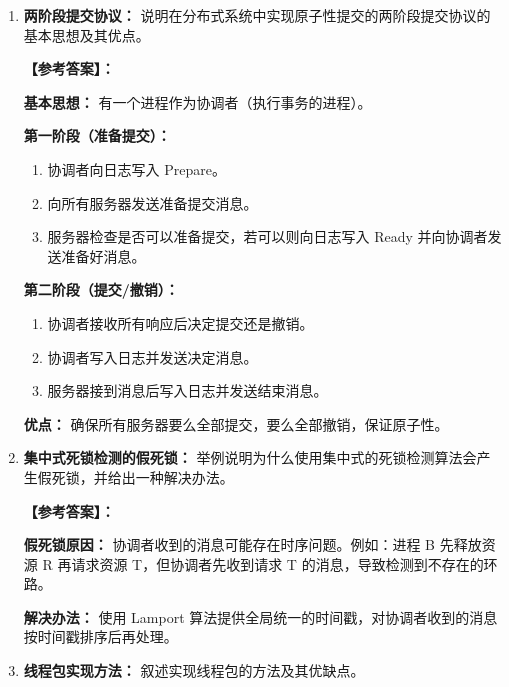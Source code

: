 \documentclass[a4paper,12pt]{article}
\newcommand{\answer}[1]{\par\vspace{0.5em}\hspace{2em}\textbf{【参考答案】：}\\{\color{blue}#1}\par\vspace{1em}}
\begin{document}
\begin{enumerate}[label=\arabic*.]
{    \textbf{优化方法：}
    \begin{itemize}
        \item \textbf{父辈工作区指针：} 私有空间中只包含指向父辈工作区的指针，最顶层事务的工作区是真正的文件系统。
        \item \textbf{索引节点复制：} 只复制索引节点（包含文件所在磁盘块位置的信息），不复制全部文件内容。
    \end{itemize}
    }

    \item \textbf{两阶段提交协议：}
    说明在分布式系统中实现原子性提交的两阶段提交协议的基本思想及其优点。
    
    \answer{
    \textbf{基本思想：} 有一个进程作为协调者（执行事务的进程）。
    
    \textbf{第一阶段（准备提交）：}
    \begin{enumerate}
        \item 协调者向日志写入 Prepare。
        \item 向所有服务器发送准备提交消息。
        \item 服务器检查是否可以准备提交，若可以则向日志写入 Ready 并向协调者发送准备好消息。
    \end{enumerate}
    
    \textbf{第二阶段（提交/撤销）：}
    \begin{enumerate}
        \item 协调者接收所有响应后决定提交还是撤销。
        \item 协调者写入日志并发送决定消息。
        \item 服务器接到消息后写入日志并发送结束消息。
    \end{enumerate}
    
    \textbf{优点：} 确保所有服务器要么全部提交，要么全部撤销，保证原子性。
    }

    \item \textbf{集中式死锁检测的假死锁：}
    举例说明为什么使用集中式的死锁检测算法会产生假死锁，并给出一种解决办法。
    
    \answer{
    \textbf{假死锁原因：}
    协调者收到的消息可能存在时序问题。例如：进程 B 先释放资源 R 再请求资源 T，但协调者先收到请求 T 的消息，导致检测到不存在的环路。
    
    \textbf{解决办法：} 使用 Lamport 算法提供全局统一的时间戳，对协调者收到的消息按时间戳排序后再处理。
    }

    \item \textbf{线程包实现方法：}
    叙述实现线程包的方法及其优缺点。
    

\end{enumerate}
\end{document}
